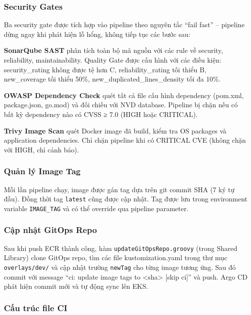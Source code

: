 \documentclass[13pt,a4paper,twoside]{extarticle}
\begin{document}
\subsubsection{Security Gates}

Ba security gate được tích hợp vào pipeline theo nguyên tắc ``fail fast'' -- pipeline dừng ngay khi phát hiện lỗ hổng, không tiếp tục các bước sau:

\textbf{SonarQube SAST} phân tích toàn bộ mã nguồn với các rule về security, reliability, maintainability. Quality Gate được cấu hình với các điều kiện: security\_rating không được tệ hơn C, reliability\_rating tối thiểu B, new\_coverage tối thiểu 50\%, new\_duplicated\_lines\_density tối đa 10\%.

\textbf{OWASP Dependency Check} quét tất cả file cấu hình dependency (pom.xml, package.json, go.mod) và đối chiếu với NVD database. Pipeline bị chặn nếu có bất kỳ dependency nào có CVSS ≥ 7.0 (HIGH hoặc CRITICAL).

\textbf{Trivy Image Scan} quét Docker image đã build, kiểm tra OS packages và application dependencies. Chỉ chặn pipeline khi có CRITICAL CVE (không chặn với HIGH, chỉ cảnh báo).

\subsubsection{Quản lý Image Tag}

Mỗi lần pipeline chạy, image được gán tag dựa trên git commit SHA (7 ký tự đầu). Đồng thời tag \texttt{latest} cũng được cập nhật. Tag được lưu trong environment variable \texttt{IMAGE\_TAG} và có thể override qua pipeline parameter.

\subsubsection{Cập nhật GitOps Repo}

Sau khi push ECR thành công, hàm \texttt{updateGitOpsRepo.groovy} (trong Shared Library) clone GitOps repo, tìm các file kustomization.yaml trong thư mục \texttt{overlays/dev/} và cập nhật trường \texttt{newTag} cho từng image tương ứng. Sau đó commit với message ``ci: update image tags to <sha> [skip ci]'' và push. Argo CD phát hiện commit mới và tự động sync lên EKS.

\subsubsection{Cấu trúc file CI}
\end{document}
